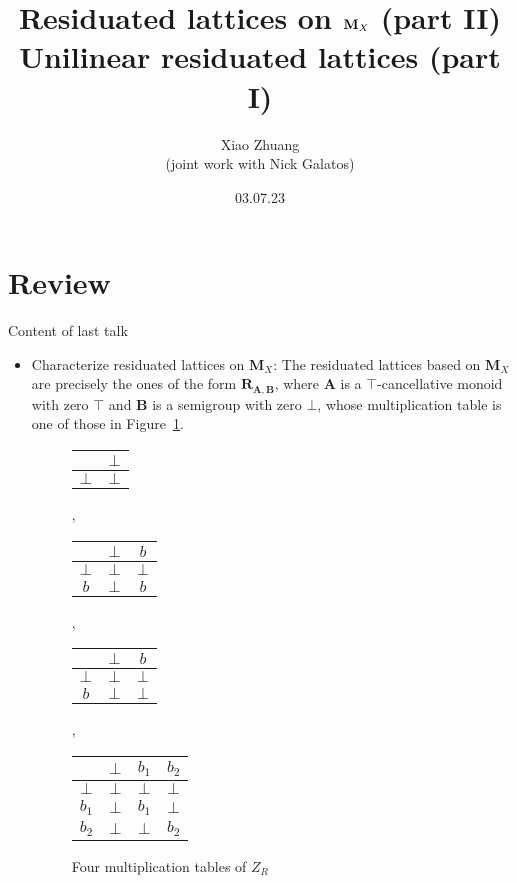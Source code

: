\documentclass[professionalfont, 10pt]{beamer} %
\title[Algebraic logic presentation 2]{Residuated lattices on ${\mathbf {M} }_X$ (part II)\\
Unilinear residuated lattices (part I)}
\author[Xiao Zhuang]{Xiao Zhuang\\
  \small{(joint work with Nick Galatos)} }
\institute[University of Denver]
{University of Denver}
\date{03.07.23}
\theoremstyle{plain}
\theoremstyle{definition}
\begin{document}


\begin{frame}[plain]{}
\hsize\textwidth
\columnwidth\textwidth
\maketitle

\end{frame}

\section{Review}

\begin{frame}{Content of last talk}
    \begin{itemize}
        \item Characterize residuated lattices on $\mathbf{M}_X$:
        The residuated lattices based on $\mathbf{M}_X$ are precisely the ones of the form $\mathbf{R}_{\mathbf{A}, \mathbf{B}}$, where $\mathbf{A}$ is a $\top$-cancellative monoid with zero $\top$ and $\mathbf{B}$ is a semigroup with zero $\bot$, whose multiplication table is one of those in Figure~\ref{f:4tables}.

        \begin{figure}[h]
            \begin{center}
\begin{tabular}{c | c}
 & $\bot$\\
\hline
$\bot$ & $\bot$ 
\end{tabular}
,
\begin{tabular}{c | c c}
 & $\bot$ & $b$\\
\hline
$\bot$ & $\bot$ & $\bot$\\
$b$ & $\bot$ & $b$
\end{tabular}
,
\begin{tabular}{c | c c}
 & $\bot$ & $b$\\
\hline
$\bot$ & $\bot$ & $\bot$\\
$b$ & $\bot$ & $\bot$
\end{tabular}
,
\begin{tabular}{c | c c c}
 & $\bot$ & $b_1$ & $b_2$\\
\hline
$\bot$ & $\bot$ & $\bot$ & $\bot$\\
$b_1$ & $\bot$ & $b_1$ & $\bot$\\
$b_2$ & $\bot$ & $\bot$ & $b_2$ 	
\end{tabular}
\end{center}
            \caption{Four multiplication tables of $Z_R$}
            \label{f:4tables}
        \end{figure}
    \end{itemize}
\end{frame}
\end{document}
